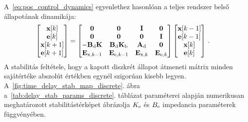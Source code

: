 A~\eqref{eq:pos_control_dynamics} egyenlethez hasonlóan a 
teljes rendszer belső állapotának dinamikája:
\begin{align}
    \begin{split}
        \begin{bmatrix}
        \mathbf{x}[k] \\
        \mathbf{e}[k] \\
        \mathbf{x}[k+1] \\ 
        \mathbf{e}[k+1] \\ 
        \end{bmatrix} &=
        \begin{bmatrix}
            \mathbf{0} & \mathbf{0} & \mathbf{I} & \mathbf{0} \\
            \mathbf{0} & \mathbf{0} & \mathbf{0} & \mathbf{I} \\
            -\mathbf{B}_{\mathrm{d}} \mathbf{K} & \mathbf{B}_{\mathrm{d}} \mathbf{K}_{\mathrm{b}} & \mathbf{A}_{\mathrm{d}} & \mathbf{0} \\
            \mathbf{E}_{\mathrm{x},k-1} & \mathbf{E}_{\mathrm{e},k-1} & \mathbf{E}_{\mathrm{x},k} & \mathbf{E}_{\mathrm{e},k} \\ 
        \end{bmatrix}
        \begin{bmatrix}
            \mathbf{x}[k-1] \\
            \mathbf{e}[k-1] \\
            \mathbf{x}[k] \\ 
            \mathbf{e}[k] \\ 
        \end{bmatrix}\,.
    \end{split}        
\end{align}
A stabilitás feltétele, hogy a kapott diszkrét állapot átmeneti mátrix minden sajátértéke abszolút 
értékben egynél szigorúan kisebb legyen. A~\ref{fig:time_delay_stab_map_discrete}. ábra a~\ref{tab:delay_stab_params_discrete}. táblázat paraméterei alapján numerikusan 
meghatározott stabilitástérképet ábrázolja \(K_{\mathrm{e}}\) és \(B_{\mathrm{e}}\) impedancia paraméterek függvényében. 
